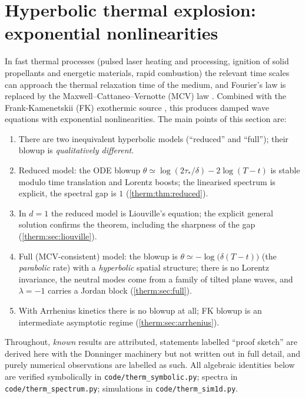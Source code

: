 \section{Hyperbolic thermal explosion: exponential nonlinearities}
\label{therm:sec}

In fast thermal processes (pulsed laser heating and processing, ignition of
solid propellants and energetic materials, rapid combustion) the relevant time
scales can approach the thermal relaxation time of the medium, and Fourier's law
is replaced by the Maxwell--Cattaneo--Vernotte (MCV) law
\cite{Cattaneo1958,Vernotte1958,JosephPreziosi1989,Straughan2011}.  Combined
with the Frank-Kamenetskii (FK) exothermic source
\cite{FrankKamenetskii1955,BebernesEberly1989}, this produces damped wave
equations with exponential nonlinearities.  The main points of this section are:
\begin{enumerate}[label=(\arabic*),leftmargin=2em]
\item There are two inequivalent hyperbolic models (``reduced'' and ``full'');
  their blowup is \emph{qualitatively different}.
\item Reduced model: the ODE blowup $\theta\simeq\log(2\tau_*/\delta)-2\log(T-t)$ is
  stable modulo time translation and Lorentz boosts; the linearised spectrum is
  explicit, the spectral gap is $1$ (\cref{therm:thm:reduced}).
\item In $d=1$ the reduced model is Liouville's equation; the explicit general
  solution confirms the theorem, including the sharpness of the gap
  (\cref{therm:sec:liouville}).
\item Full (MCV-consistent) model: the blowup is $\theta\simeq-\log\bigl(\delta(T-t)\bigr)$ (the
  \emph{parabolic} rate) with a \emph{hyperbolic} spatial structure; there is no
  Lorentz invariance, the neutral modes come from a family of tilted plane
  waves, and $\lambda=-1$ carries a Jordan block (\cref{therm:sec:full}).
\item With Arrhenius kinetics there is no blowup at all; FK blowup is an
  intermediate asymptotic regime (\cref{therm:sec:arrhenius}).
\end{enumerate}
Throughout, \emph{known} results are attributed, statements labelled
``proof sketch'' are derived here with the Donninger machinery but not written
out in full detail, and purely numerical observations are labelled as such.
All algebraic identities below are verified symbolically in
\texttt{code/therm\_symbolic.py}; spectra in \texttt{code/therm\_spectrum.py};
simulations in \texttt{code/therm\_sim1d.py}.

